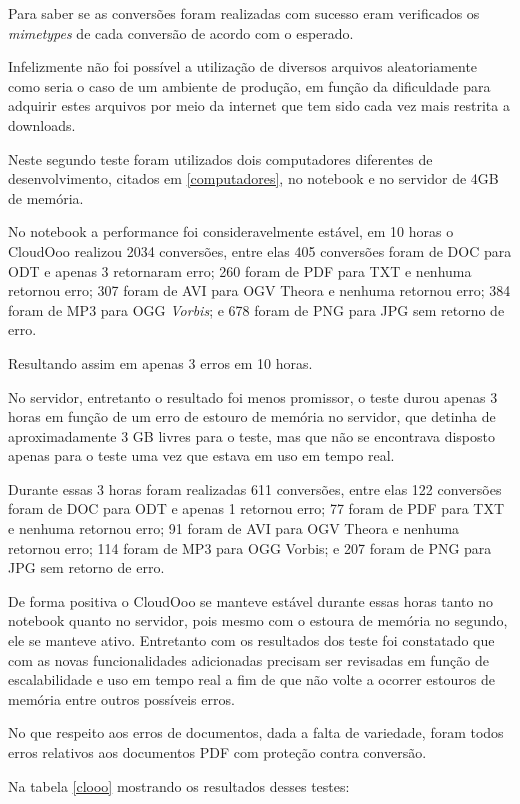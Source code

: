 Para saber se as conversões foram realizadas com sucesso eram verificados os \textit{mimetypes} de cada conversão de acordo com o esperado.

Infelizmente não foi possível a utilização de diversos arquivos aleatoriamente como seria o caso de um ambiente de produção, em função da dificuldade para adquirir estes arquivos por meio da internet que tem sido cada vez mais restrita a downloads.

Neste segundo teste foram utilizados dois computadores diferentes de desenvolvimento, citados em \ref{computadores}, no notebook e no servidor de 4GB de memória.

No notebook a performance foi consideravelmente estável, em 10 horas o CloudOoo realizou 2034 conversões, entre elas 405 conversões foram de DOC para ODT e apenas 3 retornaram erro; 260 foram de PDF para TXT e nenhuma retornou erro; 307 foram de AVI para OGV Theora e nenhuma retornou erro; 384 foram de MP3 para OGG \textit{Vorbis}; e 678 foram de PNG para JPG sem retorno de erro.

Resultando assim em apenas 3 erros em 10 horas.

No servidor, entretanto o resultado foi menos promissor, o teste durou apenas 3 horas em função de um erro de estouro de memória no servidor, que detinha de aproximadamente 3 GB livres para o teste, mas que não se encontrava disposto apenas para o teste uma vez que estava em uso em tempo real. 

Durante essas 3 horas foram realizadas 611 conversões, entre elas 122 conversões foram de DOC para ODT e apenas 1 retornou erro; 77 foram de PDF para TXT e nenhuma retornou erro; 91 foram de AVI para OGV Theora e nenhuma retornou erro; 114 foram de MP3 para OGG Vorbis; e 207 foram de PNG para JPG sem retorno de erro.

De forma positiva o CloudOoo se manteve estável durante essas horas tanto no notebook quanto no servidor, pois mesmo com o estoura de memória no segundo, ele se manteve ativo. Entretanto com os resultados dos teste foi constatado que com as novas funcionalidades adicionadas precisam ser revisadas em função de escalabilidade e uso em tempo real a fim de que não volte a ocorrer estouros de memória entre outros possíveis erros. 

No que respeito aos erros de documentos, dada a falta de variedade, foram todos erros relativos aos documentos PDF com proteção contra conversão.

Na tabela \ref{clooo} mostrando os resultados desses testes:

